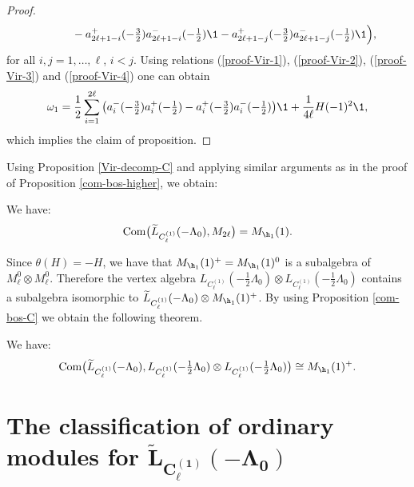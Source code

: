 \documentclass[pdftex]{sigma}
\begin{document}
\begin{proof}
\begin{gather}
\quad\qquad{} - a_{2\ell +1-i} ^+ (-\tfrac{3}{2}) a_{2\ell
+1-i}^- (-\tfrac{1}{2}){\1} - a_{2\ell +1-j} ^+ (-\tfrac{3}{2})
a_{2\ell
+1-j} ^- (-\tfrac{1}{2}){\1} \Big), \label{proof-Vir-4}
  \end{gather}
for all $i,j =1, \dots, \ell$, $i<j$. Using relations
(\ref{proof-Vir-1}), (\ref{proof-Vir-2}), (\ref{proof-Vir-3}) and
(\ref{proof-Vir-4}) one can obtain
\begin{gather*} \omega _{1}=
\frac{1}{2} \sum_{i=1} ^{2 \ell} \big( a_i ^- (- \tfrac{3}{2}) a_i ^{+}
(-\tfrac{1}{2} ) -a_i ^+ (- \tfrac{3}{2}) a_i ^{-} (-\tfrac{1}{2} ) \big)
{\1} + \frac{1}{4 \ell} H(-1) ^{2} {\1},
 \end{gather*}
which implies the claim of proposition.
\end{proof}



Using Proposition \ref{Vir-decomp-C} and applying similar arguments
as in the proof of Proposition \ref{com-bos-higher}, we obtain:

\begin{proposition} \label{com-bos-C} We have:
\[ {\rm Com} \big({\widetilde L}_{C_{\ell} ^{(1)}}(- \Lambda_0), M_{2
\ell}\big) = M_ { {\h}_1} (1).\]
\end{proposition}


 Since $\theta (H) = -H$, we have that $M_ { {\h}_1} (1)^+
=M_ { {\h}_1} (1) ^0$ is a subalgebra of $M_{\ell} ^0 \otimes
M_{\ell} ^0$.
 Therefore the  vertex algebra $L_{C_{\ell} ^{(1)}}(-\tfrac{1}{2}\Lambda_0) \otimes
 L_{C_{\ell} ^{(1)}}(-\tfrac{1}{2}\Lambda_0)$ contains a subalgebra isomorphic
to ${\widetilde L}_{C_{\ell} ^{(1)}}(- \Lambda_0) \otimes M_ {
{\h}_1} (1) ^+$. By using Proposition \ref{com-bos-C} we obtain the
following theorem.

\begin{theorem} \label{coset-bos-r-C}We have:
\[ {\rm Com} \big( {\widetilde L}_{C_{\ell} ^{(1)}}(-\Lambda_0),
L_{C_{\ell} ^{(1)}}(-\tfrac{1}{2}\Lambda_0) \otimes L_{C_{\ell}
^{(1)}}(-\tfrac{1}{2}\Lambda_0) \big) \cong M_ { {\h}_1}  (1) ^+.\]
\end{theorem}


\section[The classification of ordinary modules for  ${\widetilde L}_{C_{\ell} ^{(1)}}(-
\Lambda_0)$]{The classif\/ication of ordinary modules for  $\boldsymbol{{\widetilde L}_{C_{\ell} ^{(1)}}(-
\Lambda_0)}$} \label{sect.class.C}
\end{document}

